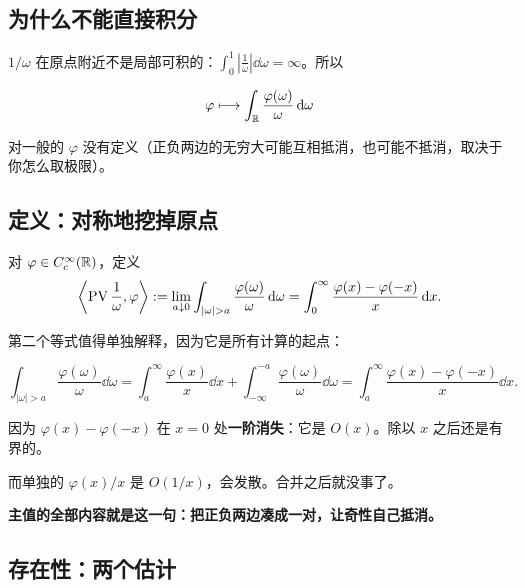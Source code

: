 \subsection{为什么不能直接积分}

$1/\omega$ 在原点附近不是局部可积的：$\int_{0}^{1}|\frac{1}{\omega}|\dd\omega=\infty$。所以

\begin{equation}
\varphi\longmapsto\int_{\mathbb{R}}\frac{\varphi(\omega)}{\omega}\mathop{}\!\mathrm{d}\omega
\end{equation}

对一般的 $\varphi$ 没有定义（正负两边的无穷大可能互相抵消，也可能不抵消，取决于你怎么取极限）。

\subsection{定义：对称地挖掉原点}

\begin{defn}[Cauchy 主值]\label{def:PV}
对 $\varphi\in C_c^{\infty}(\mathbb{R})$，定义
\begin{equation}
\left\langle\PV\frac{1}{\omega},\varphi\right\rangle
:=\lim_{a\downarrow0}\int_{|\omega|>a}\frac{\varphi(\omega)}{\omega}\dd\omega
=\int_{0}^{\infty}\frac{\varphi(x)-\varphi(-x)}{x}\dd x .\label{eq:PVdef}
\end{equation}
\end{defn}

第二个等式值得单独解释，因为它是所有计算的起点：

\begin{equation}
\int_{|\omega|>a}\frac{\varphi(\omega)}{\omega}\dd\omega
=\int_{a}^{\infty}\frac{\varphi(x)}{x}\dd x+\int_{-\infty}^{-a}\frac{\varphi(\omega)}{\omega}\dd\omega
=\int_{a}^{\infty}\frac{\varphi(x)-\varphi(-x)}{x}\dd x .
\end{equation}

\begin{ideabox}[为什么要合并成正负一对]
因为 $\varphi(x)-\varphi(-x)$ 在 $x=0$ 处\textbf{一阶消失}：它是 $O(x)$。除以 $x$ 之后还是有界的。

而单独的 $\varphi(x)/x$ 是 $O(1/x)$，会发散。合并之后就没事了。

\textbf{主值的全部内容就是这一句：把正负两边凑成一对，让奇性自己抵消。}
\end{ideabox}

\subsection{存在性：两个估计}

